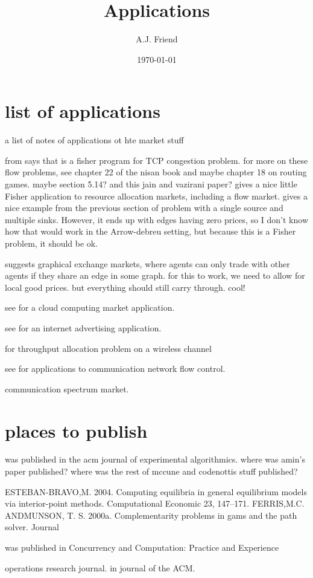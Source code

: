 \documentclass[12pt]{article}
\title{Applications}
\author{A.J. Friend}
\date{\today}
\begin{document}
\maketitle

\section{list of applications}
a list of notes of applications ot hte market stuff

from \cite[p.~104]{nisan2007algorithmic} says that \cite{kelly1997charging}
is a fisher program for TCP congestion problem. for more on these flow problems,
see chapter 22 of the nisan book and maybe chapter 18 on routing games. maybe
section 5.14? and this jain and vazirani paper?
\cite[\S5.13]{nisan2007algorithmic} gives a nice little Fisher application
to resource allocation markets, including a flow market.
\cite[\S5.14]{nisan2007algorithmic} gives a nice example from the previous
section of problem with a single
source and multiple sinks. However, it ends up with edges having zero prices,
so I don't know how that would work in the Arrow-debreu setting, but because
this is a Fisher problem, it should be ok.

\cite[\S7.5]{nisan2007algorithmic} suggests graphical exchange markets, where
agents can only trade with other agents if they share an edge in some graph.
for this to work, we need to allow for local good prices. but everything should
still carry through. cool!

see \cite{gomes2012pure} for a cloud computing market application.

see \cite{vazirani2010spending} for an internet advertising application.

\cite{vazirani2012notion} for throughput allocation problem on a wireless channel


see \cite{srikant2004mathematics,
kelly1997charging,
kelly1998rate,
low1999optimization,
yaiche2000game} for applications to communication network flow control.

\cite{ye2014competitive} communication spectrum market.

\section{places to publish}
\cite{codenotti2008experimental} was published in the acm journal of experimental algorithmics.
where was amin's paper published?
where was the rest of mccune and codenottis stuff published?

ESTEBAN-BRAVO,M. 2004. Computing equilibria in general equilibrium models via interior-point methods. Computational Economic 23, 147–171.
FERRIS,M.C. ANDMUNSON, T. S. 2000a. Complementarity problems in gams and the path solver. Journal

\cite{gomes2012pure} was published in Concurrency and Computation: Practice and Experience

\cite{vazirani2010spending} operations research journal.
\cite{vazirani2012notion} in journal of the ACM.



\end{document}
